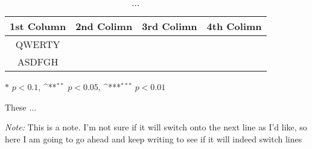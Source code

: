 \begin{table}[H]
\centering
\caption{...}
\footnotesize
{
\def\sym#1{\ifmmode^{#1}\else\(^{#1}\)\fi}
\begin{threeparttable}

\begin{tabular}{c c c c}
    \toprule
    \textbf{1st Column} & \textbf{2nd Colimn} & \textbf{3rd Colimn}\tnote{\dag} & \textbf{4th Colimn} \\ \midrule
      QWERTY\tnote{1}   &                     &                     &  \\
      ASDFGH\tnote{2}   &                     &                     &  \\ \bottomrule
\end{tabular}
  \begin{tablenotes}
    \item[$*$] $p<0.1$, \sym{**} $p<0.05$, \sym{***} $p<0.01$
    \item[\dag] These ... \smallskip
    \item \emph{Note:} This is a note. I'm not sure if it will switch onto the next line as I'd like, so here I am going to go ahead and keep writing to see if it will indeed switch lines
  \end{tablenotes}

\end{threeparttable}
}
\label{tbl:name}
\end{table}



   